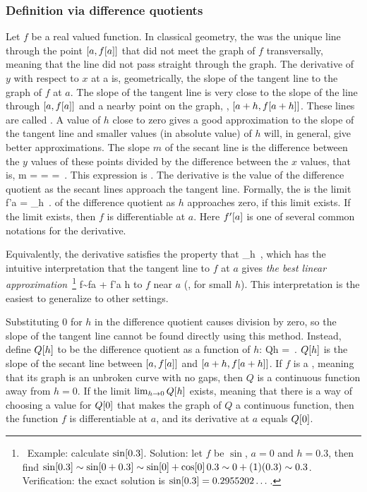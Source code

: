 \subsubsection{Definition via difference quotients}
Let $f$ be a real valued function. In classical geometry, the  was the unique line through the point $\left[{a,f\!\left[{a}\right]}\right]$ that did not meet the graph of $f$ transversally, meaning that the line did not pass straight through the graph. The derivative of $y$ with respect to $x$ at a is, geometrically, the slope of the tangent line to the graph of $f$ at $a$. The slope of the tangent line is very close to the slope of the line through $\left[{a, f\!\left[{a}\right]}\right]$ and a nearby point on the graph, \eg, $\left[{a+h, f\!\left[{a+h}\right]}\right]$. These lines are called . A value of $h$ close to zero gives a good approximation to the slope of the tangent line and smaller values (in absolute value) of $h$ will, in general, give better approximations. The slope $m$ of the secant line is the difference between the $y$ values of these points divided by the difference between the $x$ values, that is,
\beq
m =  =  = \,.
\eeq
This expression is . The derivative is the value of the difference quotient as the secant lines approach the tangent line. Formally, the  is the limit
\beq
f'\vat a = \lim_{h} \,.
\eeq
of the difference quotient as $h$ approaches zero, if this limit exists. If the limit exists, then $f$ is differentiable at $a$. Here $f'\!\left[{a}\right]$ is one of several common notations for the derivative.

Equivalently, the derivative satisfies the property that
\beq
\lim_{h} \,,
\eeq
which has the intuitive interpretation that the tangent line to $f$ at $a$ gives \emph{the best linear approximation}~\footnote{~Example: calculate $\sin\!\left[{0.3}\right]$. Solution: let $f$ be $\sin$, $a = 0$ and $h = 0.3$, then find $\sin\!\left[{0.3}\right]\sim \sin\!\left[{0+0.3}\right] \sim \sin\!\left[{0}\right] + \cos\!\left[{0}\right] 0.3 \sim 0 + (1)(0.3)\sim 0.3$. Verification: the exact solution is $\sin\!\left[{0.3}\right] = 0.2955202\dotsc$.}
\beq
f\sim f\vat a + f'\vat a h
\eeq
to $f$ near $a$ (\ie, for small $h$). This interpretation is the easiest to generalize to other settings.

Substituting 0 for $h$ in the difference quotient causes division by zero, so the slope of the tangent line cannot be found directly using this method. Instead, define $Q\!\left[{h}\right]$ to be the difference quotient as a function of $h$:
\beq
Q\vat h = \,.
\eeq
$Q\!\left[{h}\right]$ is the slope of the secant line between $\left[{a,f\!\left[{a}\right]}\right]$ and $\left[{a+h,f\!\left[{a+h}\right]}\right]$. If $f$ is a , meaning that its graph is an unbroken curve with no gaps, then $Q$ is a continuous function away from $h = 0$. If the limit $\lim_{h\to 0}Q\!\left[{h}\right]$ exists, meaning that there is a way of choosing a value for 
$Q\!\left[{0}\right]$ that makes the graph of $Q$ a continuous function, then the function $f$ is differentiable at $a$, and its derivative at $a$ equals $Q\!\left[{0}\right]$.

